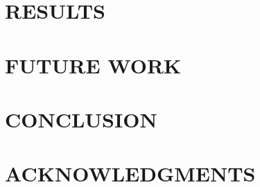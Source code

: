 \documentclass[letterpaper, 10 pt, conference]{ieeeconf}  %
\begin{document}
\section{RESULTS}



\section{FUTURE WORK}



\section{CONCLUSION}





\section{ACKNOWLEDGMENTS}


\end{document}
